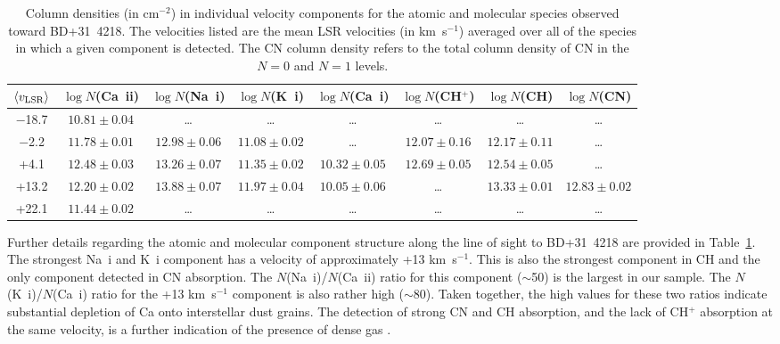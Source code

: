 \documentclass[fleqn,usenatbib]{mnras}
\begin{document}
\begin{table}
\centering
\caption{Column densities (in cm$^{-2}$) in individual velocity components for the atomic and molecular species observed toward BD+31~4218. The velocities listed are the mean LSR velocities (in km~s$^{-1}$) averaged over all of the species in which a given component is detected. The CN column density refers to the total column density of CN in the $N=0$ and $N=1$ levels.}
\label{tab:atom_mol_comp}
\begin{tabular}{cccccccc}
\hline
$\langle v_{\rm LSR} \rangle$ & $\log N$(Ca~{\sc ii}) & $\log N$(Na~{\sc i}) & $\log N$(K~{\sc i}) & $\log N$(Ca~{\sc i}) & $\log N$(CH$^+$) & $\log N$(CH) & $\log N$(CN) \\
\hline
$-$18.7 & $10.81\pm0.04$ & \ldots & \ldots & \ldots & \ldots & \ldots & \ldots \\
$-$2.2 & $11.78\pm0.01$ & $12.98\pm0.06$ & $11.08\pm0.02$ & \ldots & $12.07\pm0.16$ & $12.17\pm0.11$ & \ldots \\
+4.1 & $12.48\pm0.03$ & $13.26\pm0.07$ & $11.35\pm0.02$ & $10.32\pm0.05$ & $12.69\pm0.05$ & $12.54\pm0.05$ & \ldots \\
+13.2 & $12.20\pm0.02$ & $13.88\pm0.07$ & $11.97\pm0.04$ & $10.05\pm0.06$ & \ldots & $13.33\pm0.01$ & $12.83\pm0.02$ \\
+22.1& $11.44\pm0.02$ & \ldots & \ldots & \ldots & \ldots & \ldots & \ldots \\
\hline
\end{tabular}
\end{table}

Further details regarding the atomic and molecular component structure along the line of sight to BD+31~4218 are provided in Table~\ref{tab:atom_mol_comp}. The strongest Na~{\sc i} and K~{\sc i} component has a velocity of approximately +13 km~s$^{-1}$. This is also the strongest component in CH and the only component detected in CN absorption. The $N$(Na~{\sc i})/$N$(Ca~{\sc ii}) ratio for this component ($\sim$50) is the largest in our sample. The $N$(K~{\sc i})/$N$(Ca~{\sc i}) ratio for the +13 km~s$^{-1}$ component is also rather high ($\sim$80). Taken together, the high values for these two ratios indicate substantial depletion of Ca onto interstellar dust grains. The detection of strong CN and CH absorption, and the lack of CH$^+$ absorption at the same velocity, is a further indication of the presence of dense gas \citep[e.g.,][]{p05,s08}.
\end{document}
